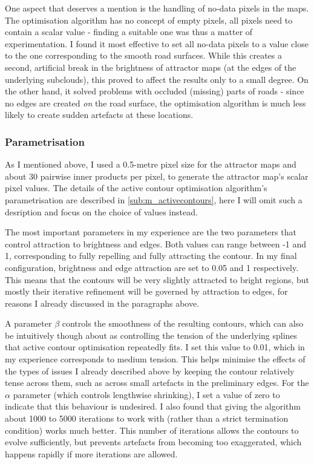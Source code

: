 One aspect that deserves a mention is the handling of no-data pixels in the maps. The optimisation algorithm has no concept of empty pixels, all pixels need to contain a scalar value - finding a suitable one was thus a matter of experimentation. I found it most effective to set all no-data pixels to a value close to the one corresponding to the smooth road surfaces. While this creates a second, artificial break in the brightness of attractor maps (at the edges of the underlying subclouds), this proved to affect the results only to a small degree. On the other hand, it solved problems with occluded (missing) parts of roads - since no edges are created \textit{on} the road surface, the optimisation algorithm is much less likely to create sudden artefacts at these locations.

\subsubsection{Parametrisation}

As I mentioned above, I used a 0.5-metre pixel size for the attractor maps and about 30 pairwise inner products per pixel, to generate the attractor map's scalar pixel values. The details of the active contour optimisation algorithm's parametrisation are described in \ref{sub:m_activecontours}, here I will omit such a desription and focus on the choice of values instead.

The most important parameters in my experience are the two parameters that control attraction to brightness and edges. Both values can range between -1 and 1, corresponding to fully repelling and fully attracting the contour. In my final configuration, brightness and edge attraction are set to 0.05 and 1 respectively. This means that the contours will be very slightly attracted to bright regions, but mostly their iterative refinement will be governed by attraction to edges, for reasons I already discussed in the paragraphs above.

A parameter $\beta$ controls the smoothness of the resulting contours, which can also be intuitively though about as controlling the tension of the underlying splines that active contour optimisation repeatedly fits. I set this value to 0.01, which in my experience corresponds to medium tension. This helps minimise the effects of the types of issues I already described above by keeping the contour relatively tense across them, such as across small artefacts in the preliminary edges. 
For the $\alpha$ parameter (which controls lengthwise shrinking), I set a value of zero to indicate that this behaviour is undesired. I also found that giving the algorithm about 1000 to 5000 iterations to work with (rather than a strict termination condition) works much better. This number of iterations allows the contours to evolve sufficiently, but prevents artefacts from becoming too exaggerated, which happens rapidly if more iterations are allowed.

